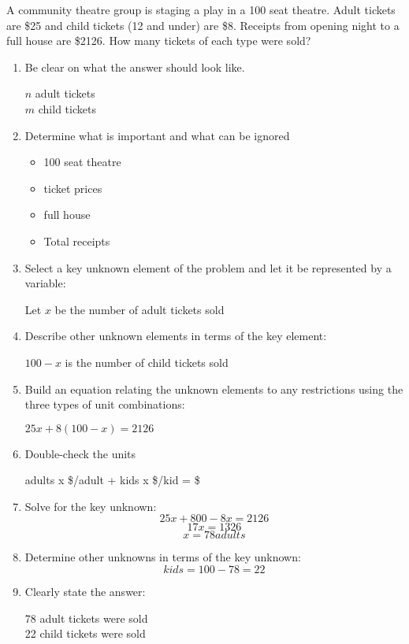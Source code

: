 \documentclass[letterpaper,12pt,fleqn]{article}
\begin{document}
\begin{example}
  A community theatre group is staging a play in a 100 seat theatre. Adult
  tickets are \$25 and child tickets (12 and under) are \$8. Receipts from
  opening night to a full house are \$2126. How many tickets of each type were
  sold?

  \begin{enumerate}
  \item Be clear on what the answer should look like.

    $n$ adult tickets \\
    $m$ child tickets

  \item Determine what is important and what can be ignored
    \begin{itemize}
    \item 100 seat theatre
    \item ticket prices
    \item full house
    \item Total receipts
    \end{itemize}

  \item Select a key unknown element of the problem and let it be represented
    by a variable:

    Let $x$ be the number of adult tickets sold

  \item Describe other unknown elements in terms of the key element:

    $100-x$ is the number of child tickets sold

  \item Build an equation relating the unknown elements to any restrictions
    using the three types of unit combinations:

    $25x+8(100-x)=2126$

  \item Double-check the units

    adults x \$/adult + kids x \$/kid = \$

  \item Solve for the key unknown:
    \[25x+800-8x=2126\]
    \[17x=1326\]
    \[x=78 adults\]

  \item Determine other unknowns in terms of the key unknown:
    \[kids=100-78=22\]

  \item Clearly state the answer:

    78 adult tickets were sold \\
    22 child tickets were sold
  \end{enumerate}
\end{example}
\end{document}
